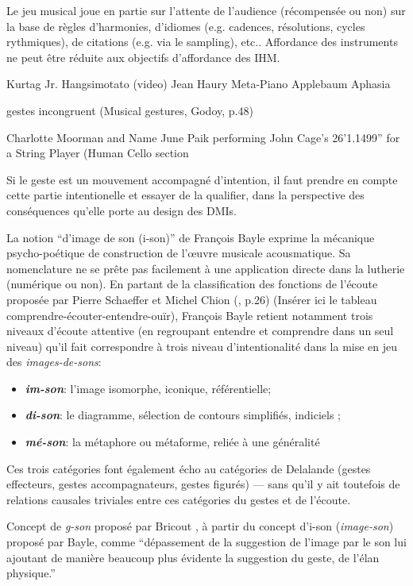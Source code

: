 Le jeu musical joue en partie sur l’attente de l’audience (récompensée ou non) sur la base de règles d'harmonies, d’idiomes (e.g. cadences, résolutions, cycles rythmiques), de citations (e.g. via le sampling), etc..
Affordance des instruments ne peut être réduite aux objectifs d’affordance des IHM.


Kurtag Jr. Hangsimotato (video)
Jean Haury Meta-Piano
Applebaum Aphasia

gestes incongruent (Musical gestures, Godoy, p.48)


Charlotte Moorman and Name June Paik performing John Cage’s 26’1.1499” for a String Player (Human Cello section



Si le geste est un mouvement accompagné d'intention, il faut prendre en compte cette partie intentionelle et essayer de la qualifier, dans la perspective des conséquences qu'elle porte au design des \glspl{DMI}.

La notion ``d'image de son (i-son)'' de François Bayle exprime la mécanique psycho-poétique de construction de l'œuvre musicale acousmatique. Sa nomenclature ne se prête pas facilement à une application directe dans la lutherie (numérique ou non).
En partant de la classification des fonctions de l'écoute proposée par Pierre Schaeffer et Michel Chion (\cite{chion_guide_1994}, p.26) (Insérer ici le tableau comprendre-écouter-entendre-ouïr), François Bayle retient notamment trois niveaux d'écoute attentive (en regroupant entendre et comprendre dans un seul niveau) qu'il fait correspondre à trois niveau d'intentionalité dans la mise en jeu des \textit{images-de-sons}:
\vspace{-1em}
\begin{itemize}[noitemsep]
\item \textbf{\textit{im-son}}: l'image isomorphe, iconique, référentielle;
\item \textbf{\textit{di-son}}: le diagramme, sélection de contours simplifiés, indiciels ;
\item \textbf{\textit{mé-son}}: la métaphore ou métaforme, reliée à une généralité
\end{itemize}

Ces trois catégories font également écho au catégories de Delalande (gestes effecteurs, gestes accompagnateurs, gestes figurés) — sans qu'il y ait toutefois de relations causales triviales entre ces catégories du gestes et de l'écoute.

Concept de \textit{g-son} proposé par Bricout \cite{bricout_les_2011}, à partir du concept d'i-son (\textit{image-son}) proposé par Bayle, comme ``dépassement de la suggestion de l'image par le son lui ajoutant de manière beaucoup plus évidente la suggestion du geste, de l'élan physique.''

